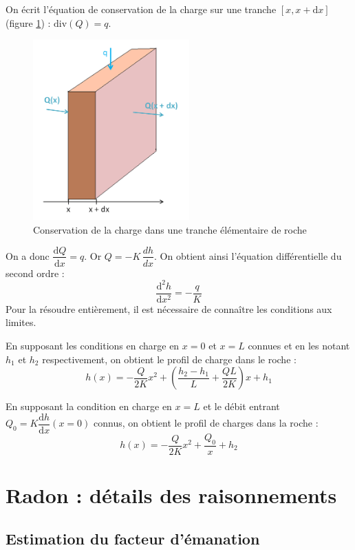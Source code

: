 \documentclass{article}
\begin{document}
On écrit l’équation de conservation de la charge sur une tranche $[x, x + \text{d}x]$ (figure \ref{fig:schema_carre_ecoulement}) : $\text{div} (Q)=q$.

\begin{figure}[H]
    \centering
    \includegraphics[width=6cm]{A_III_B_4.png}
    \caption{Conservation de la charge dans une tranche élémentaire de roche}
    \label{fig:schema_carre_ecoulement}
\end{figure}

On a donc $\dfrac{\text{d}Q}{\text{d}x}=q$.
Or $Q= -K\, \dfrac{dh}{dx}$.
On obtient ainsi l’équation différentielle du second ordre : $$\dfrac{\text{d}^2h}{\text{d}x^2}=-\frac{q}{K}$$
Pour la résoudre entièrement, il est nécessaire de connaître les conditions aux limites. 

En supposant les conditions en charge en $x = 0$ et $x = L$ connues et en les notant $h_1$ et $h_2$ respectivement, on obtient le profil de charge dans le roche :
$$h(x) = -\frac{Q}{2K}x^2 + \left(\frac{h_2 - h_1}{L} + \frac{QL}{2K}\right)x + h_1$$

En supposant la condition en charge en $x = L$ et le débit entrant $Q_0 = K \dfrac{\text{d}h}{\text{d}x}(x = 0)$ connus, on obtient le profil de charges dans la roche :
$$h(x) = -\frac{Q}{2K}x^2 + \frac{Q_0}x + h_2$$

\newpage
\section{Radon : détails des raisonnements}
\label{annexe:detail_modele_radon_sec}
\subsection{Estimation du facteur d'émanation}
\label{annexe:emanation}
\end{document}
